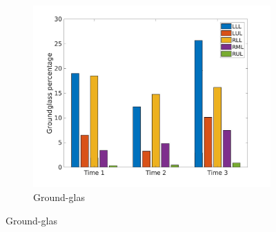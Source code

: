 \begin{figure}[H] 
\centering
\begin{subfigure}{.46\linewidth}%
  \includegraphics[width=\linewidth,trim={{.0\wd0} {.0\wd0} {.0\wd0} {.0\wd0}},clip]{QuantitativeAnalysis/Image/IPF21GroundglassLobarRegionDiseaseDistributionOverTime.jpg} %
  \caption{Ground-glas}
  \label{fig:IPF21LobarRegionDiseaseDistributionOverTimeMain-a} 
\end{subfigure} 
\hspace{.3in}

\end{figure}
